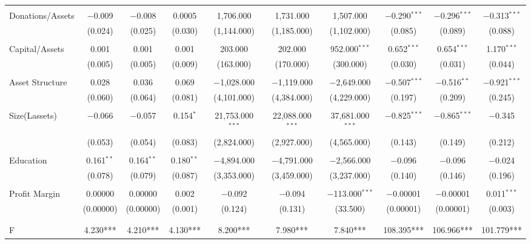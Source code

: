 \documentclass[a4paper,nobind]{templates/ociamthesis}
\begin{document}
\begin{landscape}
\begin{table}[!htbp]
\begin{tabular}{@{\extracolsep{5pt}}lccccccccc}
  & & & & & & & & & \\ 
 Donations/Assets & $-$0.009 & $-$0.008 & 0.0005 & 1,706.000 & 1,731.000 & 1,507.000 & $-$0.290$^{***}$ & $-$0.296$^{***}$ & $-$0.313$^{***}$ \\ 
  & (0.024) & (0.025) & (0.030) & (1,144.000) & (1,185.000) & (1,102.000) & (0.085) & (0.089) & (0.088) \\ 
  & & & & & & & & & \\ 
 Capital/Assets & 0.001 & 0.001 & 0.001 & 203.000 & 202.000 & 952.000$^{***}$ & 0.652$^{***}$ & 0.654$^{***}$ & 1.170$^{***}$ \\ 
  & (0.005) & (0.005) & (0.009) & (163.000) & (170.000) & (300.000) & (0.030) & (0.031) & (0.044) \\ 
  & & & & & & & & & \\ 
 Asset Structure & 0.028 & 0.036 & 0.069 & $-$1,028.000 & $-$1,119.000 & $-$2,649.000 & $-$0.507$^{***}$ & $-$0.516$^{**}$ & $-$0.921$^{***}$ \\ 
  & (0.060) & (0.064) & (0.081) & (4,101.000) & (4,384.000) & (4,229.000) & (0.197) & (0.209) & (0.245) \\ 
  & & & & & & & & & \\ 
 Size(Lassets) & $-$0.066 & $-$0.057 & 0.154$^{*}$ & 21,753.000$^{***}$ & 22,088.000$^{***}$ & 37,681.000$^{***}$ & $-$0.825$^{***}$ & $-$0.865$^{***}$ & $-$0.345 \\ 
  & (0.053) & (0.054) & (0.083) & (2,824.000) & (2,927.000) & (4,565.000) & (0.143) & (0.149) & (0.212) \\ 
  & & & & & & & & & \\ 
 Education & 0.161$^{**}$ & 0.164$^{**}$ & 0.180$^{**}$ & $-$4,894.000 & $-$4,791.000 & $-$2,566.000 & $-$0.096 & $-$0.096 & $-$0.024 \\ 
  & (0.078) & (0.079) & (0.087) & (3,353.000) & (3,459.000) & (3,237.000) & (0.140) & (0.146) & (0.196) \\ 
  & & & & & & & & & \\ 
 Profit Margin & 0.00000 & 0.00000 & 0.002 & $-$0.092 & $-$0.094 & $-$113.000$^{***}$ & $-$0.00001 & $-$0.00001 & 0.011$^{***}$ \\ 
  & (0.00000) & (0.00000) & (0.001) & (0.124) & (0.131) & (33.500) & (0.00001) & (0.00001) & (0.003) \\ 
  & & & & & & & & & \\ 
\hline \\[-1.8ex] 
F & 4.230*** & 4.210*** & 4.130*** & 8.200*** & 7.980*** & 7.840*** & 108.395*** & 106.966*** & 101.779*** \\ 

\end{tabular}
\end{table}
\end{landscape}
\end{document}
